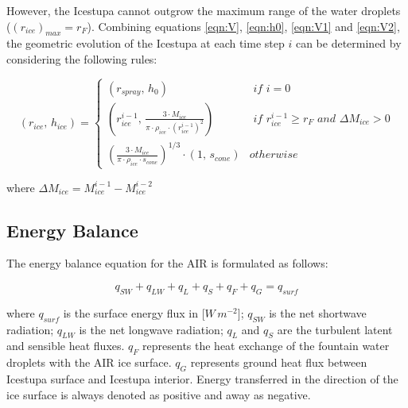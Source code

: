 \documentclass[utf8]{frontiersSCNS} %
\begin{document}

However, the Icestupa cannot outgrow the maximum range of the water droplets ($(r_{ice})_{max} = r_{F}$). Combining
equations \ref{eqn:V}, \ref{eqn:h0}, \ref{eqn:V1} and \ref{eqn:V2}, the geometric evolution of the Icestupa at each time step $i$ can
be determined by considering the following rules:

\begin{equation} (r_{ice},\, h_{ice}) = \left\{ \begin{array}{ll} (r_{spray} ,\, h_0) & \textit{ if } i=0\\
    (r_{ice}^{i-1},\, \frac{3 \cdot M_{ice}}{\pi \cdot \rho_{ice} \cdot {(r_{ice}^{i-1})}^2}) & \textit{ if }
    r_{ice}^{i-1} \geq r_{F} \textit{ and } \Delta M_{ice} > 0 \\ (\frac{3 \cdot M_{ice}}{\pi \cdot \rho_{ice} \cdot s_{cone}})^{1/3} \cdot (1,\,  s_{cone}) &
otherwise \end{array} \right.  \label{eqn:A2} \end{equation}

where $\Delta M_{ice} = M_{ice}^{i-1} - M_{ice}^{i-2}$

\subsection{Energy Balance} \label{section:EB}

The energy balance equation \citep{Hock_2005} for the AIR is formulated as follows:

\begin{equation} q_{SW} + q_{LW} + q_{L} + q_{S} + q_{F} + q_{G} = q_{surf} \label{eqn:EB} \end{equation}

where $q_{surf}$ is the surface energy flux in [$W\,m^{-2}$]; $q_{SW}$ is the net shortwave radiation; $q_{LW}$ is the
net longwave radiation; $q_{L}$ and $q_{S}$ are the turbulent latent and sensible heat fluxes. $q_{F}$ represents the heat
exchange of the fountain water droplets with the AIR ice surface. $q_{G}$ represents ground heat flux between Icestupa
surface and Icestupa interior. Energy transferred in the direction of the ice surface is always denoted as positive and
away as negative.  
\end{document}
